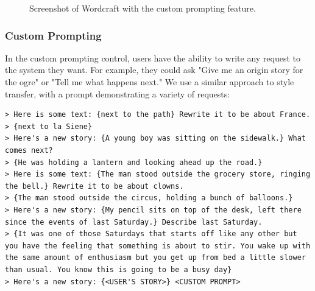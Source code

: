 \begin{figure}[tbp]
  \centering
  \caption{Screenshot of Wordcraft with the custom prompting feature.\label{fig:wc}}
\end{figure} 

\subsubsection{Custom Prompting}
In the custom prompting control, users have the ability to write any request to the system they want. For example, they could ask "Give me an origin story for the ogre" or "Tell me what happens next." We use a similar approach to style transfer, with a prompt demonstrating a variety of requests:

\begin{lstlisting}
> Here is some text: {next to the path} Rewrite it to be about France.
> {next to la Siene}
> Here's a new story: {A young boy was sitting on the sidewalk.} What comes next?
> {He was holding a lantern and looking ahead up the road.}
> Here is some text: {The man stood outside the grocery store, ringing the bell.} Rewrite it to be about clowns.
> {The man stood outside the circus, holding a bunch of balloons.}
> Here's a new story: {My pencil sits on top of the desk, left there since the events of last Saturday.} Describe last Saturday.
> {It was one of those Saturdays that starts off like any other but you have the feeling that something is about to stir. You wake up with the same amount of enthusiasm but you get up from bed a little slower than usual. You know this is going to be a busy day}
> Here's a new story: {<USER'S STORY>} <CUSTOM PROMPT>
\end{lstlisting}

